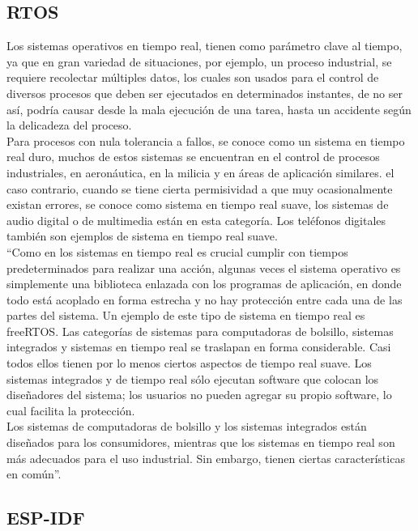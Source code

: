 \subsection{RTOS}

Los sistemas operativos en tiempo real, tienen como parámetro clave al tiempo, ya que en gran variedad de situaciones, por ejemplo, un proceso industrial, se requiere recolectar múltiples datos, los cuales son usados para el control de diversos procesos que deben ser ejecutados en determinados instantes, de no ser así, podría causar desde la mala ejecución de una tarea, hasta un accidente según la delicadeza del proceso.\\ 

Para procesos con nula tolerancia a fallos, se conoce como un sistema en tiempo real duro, muchos de estos sistemas se encuentran en el control de procesos industriales, en aeronáutica, en la milicia y en áreas de aplicación similares. el caso contrario, cuando se tiene cierta permisividad a que muy ocasionalmente existan errores, se conoce como sistema en tiempo real suave, los sistemas de audio digital o de multimedia están en esta categoría. Los teléfonos digitales también son ejemplos de sistema en tiempo real suave. \cite{SO} \\

``Como en los sistemas en tiempo real es crucial cumplir con tiempos predeterminados para realizar una acción, algunas veces el sistema operativo es simplemente una biblioteca enlazada con los programas de aplicación, en donde todo está acoplado en forma estrecha y no hay protección entre cada una de las partes del sistema. Un ejemplo de este tipo de sistema en tiempo real es freeRTOS.  Las categorías de sistemas para computadoras de bolsillo, sistemas integrados y sistemas en tiempo real se traslapan en forma considerable. Casi todos ellos tienen por lo menos ciertos aspectos de tiempo real suave. Los sistemas integrados y de tiempo real sólo ejecutan software que colocan los diseñadores del sistema; los usuarios no pueden agregar su propio software, lo cual facilita la protección. \\

Los sistemas de computadoras de bolsillo y los sistemas integrados están diseñados para los consumidores, mientras que los sistemas en tiempo real son más adecuados para el uso industrial. Sin embargo, tienen ciertas características en común''. \cite{SO}

\subsection{ESP-IDF}

